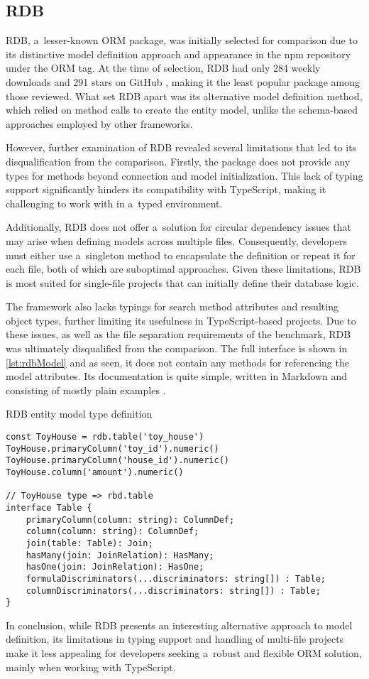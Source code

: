 \subsection{RDB}

RDB, a~lesser-known ORM package, was initially selected for comparison due to
its distinctive model definition approach and appearance in the npm repository
under the ORM tag. At the time of selection, RDB had only 284 weekly downloads
\cite{rdbNpm} and 291 stars on GitHub \cite{rdbGitHub}, making it the least
popular package among those reviewed. What set RDB apart was its alternative
model definition method, which relied on method calls to create the entity
model, unlike the schema-based approaches employed by other frameworks.

However, further examination of RDB revealed several limitations that led to its
disqualification from the comparison. Firstly, the package does not provide any
types for methods beyond connection and model initialization. This lack of
typing support significantly hinders its compatibility with TypeScript, making
it challenging to work with in a~typed environment.

Additionally, RDB does not offer a~solution for circular dependency issues that
may arise when defining models across multiple files. Consequently, developers
must either use a~singleton method to encapsulate the definition or repeat it
for each file, both of which are suboptimal approaches. Given these limitations,
RDB is most suited for single-file projects that can initially define their
database logic.

The framework also lacks typings for search method attributes and resulting
object types, further limiting its usefulness in TypeScript-based projects. Due
to these issues, as well as the file separation requirements of the benchmark,
RDB was ultimately disqualified from the comparison. The full interface is shown
in \autoref{lst:rdbModel} and as seen, it does not contain any methods for
referencing the model attributes. Its documentation is quite simple, written in
Markdown and consisting of mostly plain examples \cite{rdbDocs}.

\begin{listing}
\caption{RDB entity model type definition}
\label{lst:rdbModel}
\begin{verbatim}
const ToyHouse = rdb.table('toy_house')
ToyHouse.primaryColumn('toy_id').numeric()
ToyHouse.primaryColumn('house_id').numeric()
ToyHouse.column('amount').numeric()

// ToyHouse type => rbd.table
interface Table {
    primaryColumn(column: string): ColumnDef;
    column(column: string): ColumnDef;
    join(table: Table): Join;
    hasMany(join: JoinRelation): HasMany;
    hasOne(join: JoinRelation): HasOne;
    formulaDiscriminators(...discriminators: string[]) : Table;
    columnDiscriminators(...discriminators: string[]) : Table;
}
\end{verbatim}
\end{listing}

In conclusion, while RDB presents an interesting alternative approach to model
definition, its limitations in typing support and handling of multi-file
projects make it less appealing for developers seeking a~robust and flexible ORM
solution, mainly when working with TypeScript.